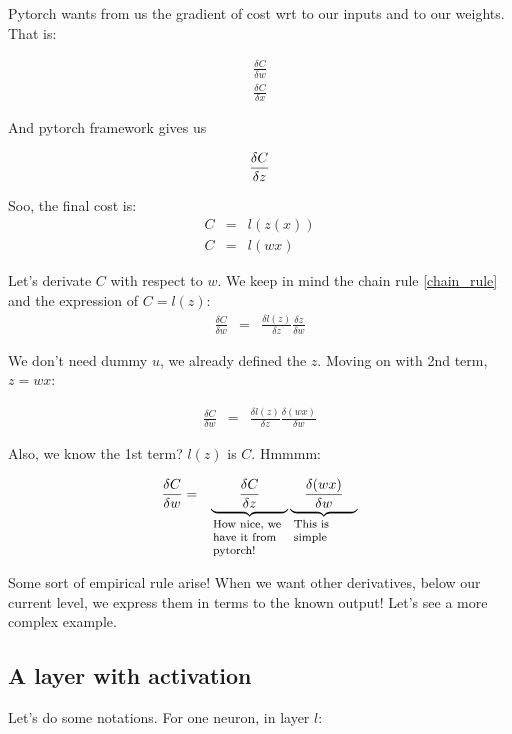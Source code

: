 \documentclass{article}
\newcommand{\explain}[2]{\underbrace{{#1}}_{\parbox{\widthof{\ensuremath{#1}}}{\footnotesize\raggedright #2}}}
\begin{document}
Pytorch wants from us the gradient of cost wrt to our inputs and to our weights. That is: 

\begin{eqnarray}
	\frac{\delta C}{\delta w} \\
 	\frac{\delta C}{\delta x}
\end{eqnarray}

And pytorch framework gives us 

\begin{equation}
	\frac{\delta C}{\delta z} \\
\end{equation}

Soo, the final cost is:
\begin{eqnarray}
	C&=&l(z(x))\\
	C&=&l(w x)
\end{eqnarray}

Let's derivate $C$ with respect to $w$. We keep in mind the chain rule \eqref{chain_rule} and the expression of  $C = l(z)$:
\begin{eqnarray}
	\frac{\delta C}{\delta w}&=&\frac{\delta l(z)}{\delta z}\frac{\delta z}{\delta w}
\end{eqnarray}

We don't need dummy $u$, we already defined the $z$. Moving on with 2nd term, $z =  w x$:

\begin{eqnarray}
	\frac{\delta C}{\delta w}&=&\frac{\delta l(z)}{\delta z}\frac{\delta (w x)}{\delta w}
\end{eqnarray}

Also, we know the 1st term? $l(z)$ is $C$. Hmmmm:

\begin{eqnarray}
	\frac{\delta C}{\delta w}&=&\explain{\qquad\frac{\delta C}{\delta z}\qquad}{How nice, we have it from pytorch!}\explain{\quad\frac{\delta (w x)}{\delta w}\quad}{This is simple}
\end{eqnarray}

Some sort of empirical rule arise! When we want other derivatives, below our current level, we express them in terms to the known output! Let's see a more complex example.

\subsection{A layer with activation}

Let's do some notations. For one neuron, in layer $l$: 
\end{document}
